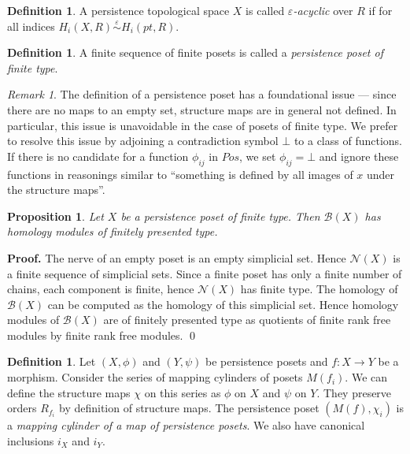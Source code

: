 \documentclass[english,12pt]{article}
\newcounter{stmcounter}[section]
\numberwithin{equation}{section}
\newtheorem{proposition}[stmcounter]{Proposition}
\theoremstyle{definition}
\newtheorem{definition}[stmcounter]{Definition}
\theoremstyle{remark}
\newtheorem{remark}[stmcounter]{Remark}
\newenvironment{pf}{\noindent\textbf{Proof.}}{\qed}
\newcommand{\define}[1]{{\textit{#1}}}
\begin{document}
\begin{definition}
  A persistence topological space $X$ is called \define{$\varepsilon$-acyclic} over $R$ if for all indices $H_i(X,R) \stackrel{\varepsilon}{\sim} H_i(pt,R)$.
\end{definition}

\begin{definition}
  A finite sequence of finite posets is called a \define{persistence poset of finite type}.
\end{definition}

\begin{remark}
  The definition of a persistence poset has a foundational issue --- since there are no maps to an empty set, structure maps are in general not defined. In particular, this issue is unavoidable in the case of posets of finite type. We prefer to resolve this issue by adjoining a contradiction symbol $\bot$ to a class of functions. If there is no candidate for a function $\phi_{ij}$ in $Pos$, we set $\phi_{ij} = \bot$ and ignore these functions in reasonings similar to ``something is defined by all images of $x$ under the structure maps''.
\end{remark}

\begin{proposition}
  Let $X$ be a persistence poset of finite type. Then $\mathcal{B}(X)$ has homology modules of finitely presented type.
\end{proposition}

\begin{pf}
  The nerve of an empty poset is an empty simplicial set. Hence $\mathcal{N}(X)$ is a finite sequence of simplicial sets. Since a finite poset has only a finite number of chains, each component is finite, hence $\mathcal{N}(X)$ has finite type. The homology of $\mathcal{B}(X)$ can be computed as the homology of this simplicial set. Hence homology modules of $\mathcal{B}(X)$ are of finitely presented type as quotients of finite rank free modules by finite rank free modules.
\end{pf}\\

\begin{definition}
  Let $(X, \phi)$ and $(Y, \psi)$ be persistence posets and $f : X \to Y$ be a morphism. Consider the series of mapping cylinders of posets $M(f_i)$. We can define the structure maps $\chi$ on this series as $\phi$ on $X$ and $\psi$ on $Y$. They preserve orders $R_{f_i}$ by definition of structure maps. The persistence poset $(M(f), \chi_i)$ is a \define{mapping cylinder of a map of persistence posets}. We also have canonical inclusions $i_X$ and $i_Y$.
\end{definition}
\end{document}
